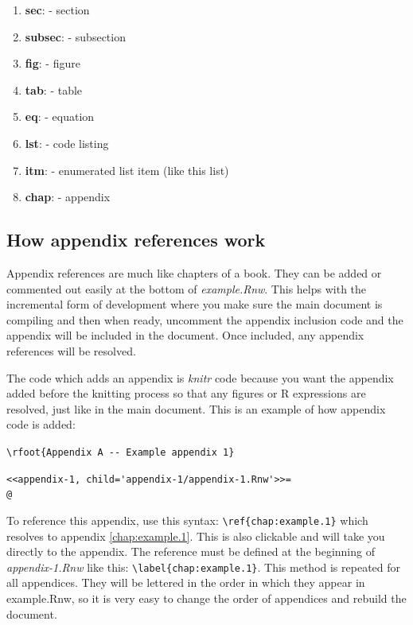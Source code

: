 \documentclass[11pt]{book}\usepackage[]{graphicx}\usepackage[]{color}
\newcommand{\rnwexamplefile}{example.Rnw}
\newcommand{\rnwappendixonefile}{appendix-1.Rnw}
\begin{document}
\begin{enumerate}
  \item    \textbf{sec}: - section
  \item \textbf{subsec}: - subsection
  \item    \textbf{fig}: - figure
  \item    \textbf{tab}: - table
  \item     \textbf{eq}: - equation
  \item    \textbf{lst}: - code listing
  \item    \textbf{itm}: - enumerated list item (like this list)
  \item   \textbf{chap}: - appendix
\end{enumerate}

\subsection{How appendix references work} \label{subsec:how.appendix.refs.work}

Appendix references are much like chapters of a book. They can be added or commented out easily at the bottom of \emph{\rnwexamplefile}. This helps with the incremental form of development where you make sure the main document is compiling and then when ready, uncomment the appendix inclusion code and the appendix will be included in the document. Once included, any appendix references will be resolved.

The code which adds an appendix is \emph{knitr} code because you want the appendix added before the knitting process so that any figures or R expressions are resolved, just like in the main document. This is an example of how appendix code is added:

\verb!\rfoot{Appendix A -- Example appendix 1}!

\verb!<<appendix-1, child='appendix-1/appendix-1.Rnw'>>=! \\
\verb!@!

 To reference this appendix, use this syntax: \verb!\ref{chap:example.1}! which resolves to appendix \ref{chap:example.1}. This is also clickable and will take you directly to the appendix. The reference must be defined at the beginning of \emph{\rnwappendixonefile} like this: \verb!\label{chap:example.1}!. This method is repeated for all appendices. They will be lettered in the order in which they appear in \rnwexamplefile, so it is very easy to change the order of appendices and rebuild the document.
 
\end{document}
